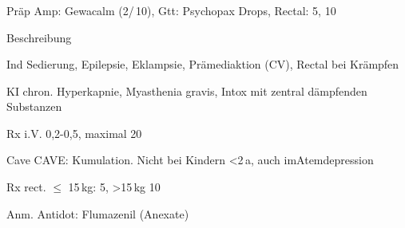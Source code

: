 \subsubsection{}
\begin{labeling}[:]{mm}
  \item[Präp] Amp: Gewacalm (2\Ml*/\,10\Mg*), Gtt: Psychopax Drops,
  Rectal: 5\Mg, 10\Mg
  \item[Beschreibung]
  \item[Ind] Sedierung, Epilepsie, Eklampsie, Prämediaktion (CV), Rectal bei
  Krämpfen
  \item[KI] chron. Hyperkapnie, Myasthenia gravis, Intox mit
zentral dämpfenden Substanzen
\item[Rx i.V.]  0,2-0,5\MgKg*, maximal 20\Mg
\item[Cave] CAVE: Kumulation. Nicht bei Kindern {\textless}2\,a, auch
imAtemdepression
\item[Rx rect.] $\leq$ 15\,kg: 5\Mg, {\textgreater}15\,kg 10\Mg
\item[Anm.] Antidot: Flumazenil (Anexate)

\end{labeling}


\subsubsection{}





